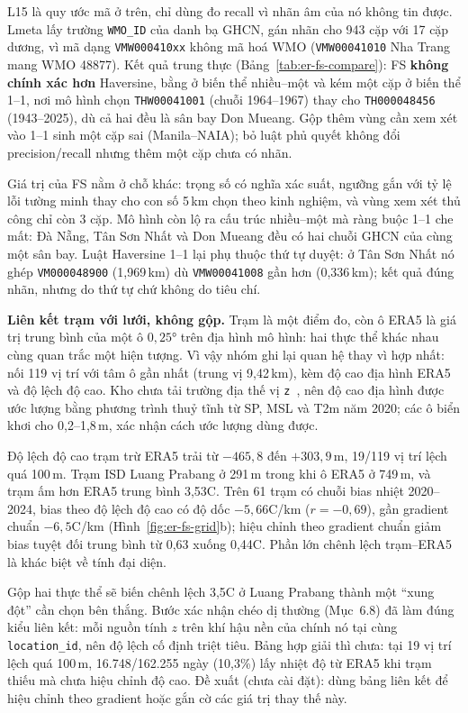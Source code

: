 \documentclass[12pt,a4paper]{report}
\begin{document}
L15 là quy ước mã ở trên, chỉ dùng đo recall vì nhãn âm của nó không tin được. Lmeta lấy trường
\texttt{WMO\_ID} của danh bạ GHCN, gán nhãn cho 943 cặp với 17 cặp dương, vì mã dạng
\texttt{VMW000410xx} không mã hoá WMO (\texttt{VMW00041010} Nha Trang mang WMO 48877). Kết quả trung
thực (Bảng~\ref{tab:er-fs-compare}): FS \textbf{không chính xác hơn} Haversine, bằng ở biến thể
nhiều--một và kém một cặp ở biến thể 1--1, nơi mô hình chọn \texttt{THW00041001} (chuỗi 1964--1967)
thay cho \texttt{TH000048456} (1943--2025), dù cả hai đều là sân bay Don Mueang. Gộp thêm vùng cần
xem xét vào 1--1 sinh một cặp sai (Manila--NAIA); bỏ luật phủ quyết không đổi precision/recall nhưng
thêm một cặp chưa có nhãn.

Giá trị của FS nằm ở chỗ khác: trọng số có nghĩa xác suất, ngưỡng gắn với tỷ lệ lỗi tường minh thay
cho con số 5\,km chọn theo kinh nghiệm, và vùng xem xét thủ công chỉ còn 3 cặp. Mô hình còn lộ ra cấu
trúc nhiều--một mà ràng buộc 1--1 che mất: Đà Nẵng, Tân Sơn Nhất và Don Mueang đều có hai chuỗi GHCN
của cùng một sân bay. Luật Haversine 1--1 lại phụ thuộc thứ tự duyệt: ở Tân Sơn Nhất nó ghép
\texttt{VM000048900} (1,969\,km) dù \texttt{VMW00041008} gần hơn (0,336\,km); kết quả đúng nhãn,
nhưng do thứ tự chứ không do tiêu chí.

\textbf{Liên kết trạm với lưới, không gộp.} Trạm là một điểm đo, còn ô ERA5 là giá trị trung bình
của một ô $0{,}25°$ trên địa hình mô hình: hai thực thể khác nhau cùng quan trắc một hiện tượng. Vì
vậy nhóm ghi lại quan hệ thay vì hợp nhất:  nối 119
vị trí với tâm ô gần nhất (trung vị 9,42\,km), kèm độ cao địa hình ERA5 và độ lệch độ cao. Kho chưa
tải trường địa thế vị \texttt{z}~\cite{hersbach2020era5}, nên độ cao địa hình được ước lượng bằng
phương trình thuỷ tĩnh từ SP, MSL và T2m năm 2020; các ô biển khơi cho 0,2--1,8\,m, xác nhận cách
ước lượng dùng được.

Độ lệch độ cao trạm trừ ERA5 trải từ $-465{,}8$ đến $+303{,}9$\,m, 19/119 vị trí lệch quá 100\,m.
Trạm ISD Luang Prabang ở 291\,m trong khi ô ERA5 ở 749\,m, và trạm ấm hơn ERA5 trung bình
3,53\textdegree{}C. Trên 61 trạm có chuỗi bias nhiệt 2020--2024, bias theo độ lệch độ cao có độ dốc
$-5{,}66$\textdegree{}C/km ($r = -0{,}69$), gần gradient chuẩn $-6{,}5$\textdegree{}C/km
(Hình~\ref{fig:er-fs-grid}b); hiệu chỉnh theo gradient chuẩn giảm bias tuyệt đối trung bình từ 0,63
xuống 0,44\textdegree{}C. Phần lớn chênh lệch trạm--ERA5 là khác biệt về tính đại diện.

Gộp hai thực thể sẽ biến chênh lệch 3,5\textdegree{}C ở Luang Prabang thành một ``xung đột'' cần chọn
bên thắng. Bước xác nhận chéo dị thường (Mục~6.8) đã làm đúng kiểu liên kết: mỗi nguồn tính $z$ trên
khí hậu nền của chính nó tại cùng \texttt{location\_id}, nên độ lệch cố định triệt tiêu. Bảng hợp giải
thì chưa: tại 19 vị trí lệch quá 100\,m, 16.748/162.255 ngày (10,3\%) lấy nhiệt độ từ ERA5 khi trạm
thiếu mà chưa hiệu chỉnh độ cao. Đề xuất (chưa cài đặt): dùng bảng liên kết để hiệu chỉnh theo
gradient hoặc gắn cờ các giá trị thay thế này.
\end{document}
